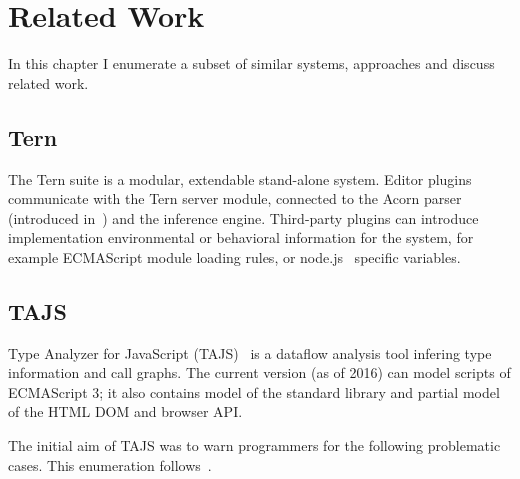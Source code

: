 \chapter{Related Work}
\label{chap:related-work}

In this chapter I enumerate a subset of similar systems, approaches and discuss related work.

\section{Tern}

The Tern suite is a modular, extendable stand-alone system. Editor plugins communicate with the Tern server module, connected to the Acorn parser (introduced in~) and the inference engine. Third-party plugins can introduce implementation environmental or behavioral information for the system, for example ECMAScript module loading rules, or node.js~\cite{nodejs} specific variables.~\cite{tern-docs}


\section{TAJS}
Type Analyzer for JavaScript (TAJS)~\cite{tajs} is a dataflow analysis tool infering type information and call graphs. The current version (as of 2016) can model scripts of ECMAScript 3; it also contains model of the standard library and partial model of the HTML DOM and browser API.~\cite{tajs-git}

The initial aim of TAJS was to warn programmers for the following problematic cases. This enumeration follows~\cite{jensen_type_2009}.

